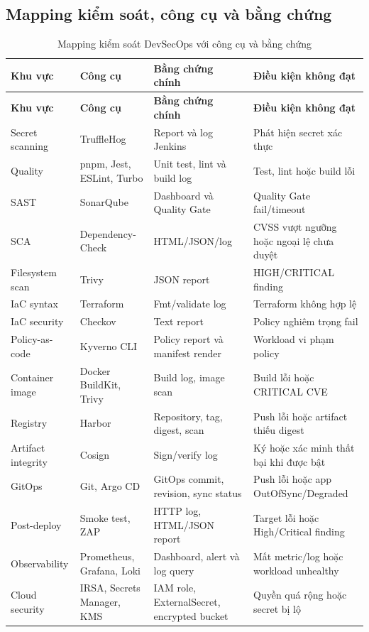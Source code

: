 \subsection{Mapping kiểm soát, công cụ và bằng chứng}

\begin{longtable}{p{}p{}p{}p{}}
\caption{Mapping kiểm soát DevSecOps với công cụ và bằng chứng}
\label{tab:devsecops-control-evidence} \\
\toprule
\textbf{Khu vực} & \textbf{Công cụ} & \textbf{Bằng chứng chính} & \textbf{Điều kiện không đạt} \\
\midrule
\endfirsthead
\toprule
\textbf{Khu vực} & \textbf{Công cụ} & \textbf{Bằng chứng chính} & \textbf{Điều kiện không đạt} \\
\midrule
\endhead
Secret scanning & TruffleHog & Report và log Jenkins & Phát hiện secret xác thực \\
Quality & pnpm, Jest, ESLint, Turbo & Unit test, lint và build log & Test, lint hoặc build lỗi \\
SAST & SonarQube & Dashboard và Quality Gate & Quality Gate fail/timeout \\
SCA & Dependency-Check & HTML/JSON/log & CVSS vượt ngưỡng hoặc ngoại lệ chưa duyệt \\
Filesystem scan & Trivy & JSON report & HIGH/CRITICAL finding \\
IaC syntax & Terraform & Fmt/validate log & Terraform không hợp lệ \\
IaC security & Checkov & Text report & Policy nghiêm trọng fail \\
Policy-as-code & Kyverno CLI & Policy report và manifest render & Workload vi phạm policy \\
Container image & Docker BuildKit, Trivy & Build log, image scan & Build lỗi hoặc CRITICAL CVE \\
Registry & Harbor & Repository, tag, digest, scan & Push lỗi hoặc artifact thiếu digest \\
Artifact integrity & Cosign & Sign/verify log & Ký hoặc xác minh thất bại khi được bật \\
GitOps & Git, Argo CD & GitOps commit, revision, sync status & Push lỗi hoặc app OutOfSync/Degraded \\
Post-deploy & Smoke test, ZAP & HTTP log, HTML/JSON report & Target lỗi hoặc High/Critical finding \\
Observability & Prometheus, Grafana, Loki & Dashboard, alert và log query & Mất metric/log hoặc workload unhealthy \\
Cloud security & IRSA, Secrets Manager, KMS & IAM role, ExternalSecret, encrypted bucket & Quyền quá rộng hoặc secret bị lộ \\
\bottomrule
\end{longtable}

